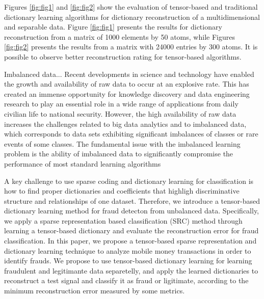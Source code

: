 Figures \ref{fig:fig1} and \ref{fig:fig2} show the evaluation of tensor-based and traditional dictionary learning algorithms for dictionary reconstruction of a multidimensional and separable data. Figure \ref{fig:fig1} presents the results for dictionary reconstruction from a matrix of 1000 elements by 50 atoms, while Figures \ref{fig:fig2} presents the results from a matrix with 24000 entries by 300 atoms. It is possible to observe better reconstruction rating for tensor-based algorithms. 

Imbalanced data...
Recent developments in science and technology have enabled the growth and availability of raw data to occur at an explosive rate. This has created an immense opportunity for knowledge discovery and data engineering research to play an essential role in a wide range of applications from daily civilian life to national security. However, the high availability of raw data increases the challenges related to big data analytics and to imbalanced data, which corresponds to data sets exhibiting significant imbalances of classes or rare events of some classes. The fundamental issue with the imbalanced learning problem is the ability of imbalanced data to significantly compromise the performance of most standard learning algorithms

A key challenge to use sparse coding and dictionary learning for classification is how to find proper dictionaries and coefficients that highligh discriminative structure and relationships of one dataset. Therefore, we introduce a tensor-based dictionary learning method for fraud detecton from unbalanced data. Specifically, we apply a sparse representation based classification (SRC) method through learning a tensor-based dictionary and evaluate the reconstruction error for fraud classification. In this paper, we propose a tensor-based sparse representation and dictionary learning technique to analyze mobile money transactions in order to identify frauds. We propose to use tensor-based dictionary learning for learning fraudulent and legitimante data separetelly, and apply the learned dictionaries to reconstruct a test signal and classify it as fraud or ligitimate, according to the minimum reconstruction error measured by some metrics.


